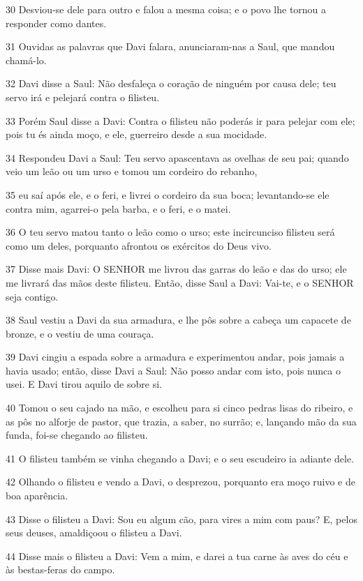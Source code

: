 \par 30 Desviou-se dele para outro e falou a mesma coisa; e o povo lhe tornou a responder como dantes.
\par 31 Ouvidas as palavras que Davi falara, anunciaram-nas a Saul, que mandou chamá-lo.
\par 32 Davi disse a Saul: Não desfaleça o coração de ninguém por causa dele; teu servo irá e pelejará contra o filisteu.
\par 33 Porém Saul disse a Davi: Contra o filisteu não poderás ir para pelejar com ele; pois tu és ainda moço, e ele, guerreiro desde a sua mocidade.
\par 34 Respondeu Davi a Saul: Teu servo apascentava as ovelhas de seu pai; quando veio um leão ou um urso e tomou um cordeiro do rebanho,
\par 35 eu saí após ele, e o feri, e livrei o cordeiro da sua boca; levantando-se ele contra mim, agarrei-o pela barba, e o feri, e o matei.
\par 36 O teu servo matou tanto o leão como o urso; este incircunciso filisteu será como um deles, porquanto afrontou os exércitos do Deus vivo.
\par 37 Disse mais Davi: O SENHOR me livrou das garras do leão e das do urso; ele me livrará das mãos deste filisteu. Então, disse Saul a Davi: Vai-te, e o SENHOR seja contigo.
\par 38 Saul vestiu a Davi da sua armadura, e lhe pôs sobre a cabeça um capacete de bronze, e o vestiu de uma couraça.
\par 39 Davi cingiu a espada sobre a armadura e experimentou andar, pois jamais a havia usado; então, disse Davi a Saul: Não posso andar com isto, pois nunca o usei. E Davi tirou aquilo de sobre si.
\par 40 Tomou o seu cajado na mão, e escolheu para si cinco pedras lisas do ribeiro, e as pôs no alforje de pastor, que trazia, a saber, no surrão; e, lançando mão da sua funda, foi-se chegando ao filisteu.
\par 41 O filisteu também se vinha chegando a Davi; e o seu escudeiro ia adiante dele.
\par 42 Olhando o filisteu e vendo a Davi, o desprezou, porquanto era moço ruivo e de boa aparência.
\par 43 Disse o filisteu a Davi: Sou eu algum cão, para vires a mim com paus? E, pelos seus deuses, amaldiçoou o filisteu a Davi.
\par 44 Disse mais o filisteu a Davi: Vem a mim, e darei a tua carne às aves do céu e às bestas-feras do campo.
